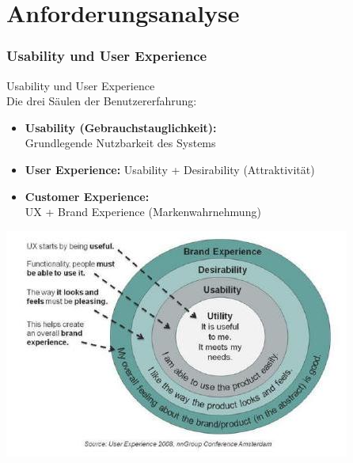 \section{Anforderungsanalyse}

\subsubsection{Usability und User Experience}

\begin{concept}{Usability und User Experience}\\
Die drei Säulen der Benutzererfahrung:
\begin{itemize}
    \item \textbf{Usability (Gebrauchstauglichkeit):} \\ Grundlegende Nutzbarkeit des Systems
    \item \textbf{User Experience:} Usability + Desirability (Attraktivität)
    \item \textbf{Customer Experience:} \\ UX + Brand Experience (Markenwahrnehmung)
\end{itemize}
\includegraphics[width=0.9\linewidth]{images/2024_12_29_0d1d7b5551ea1b4b41bdg-02}
\end{concept}

